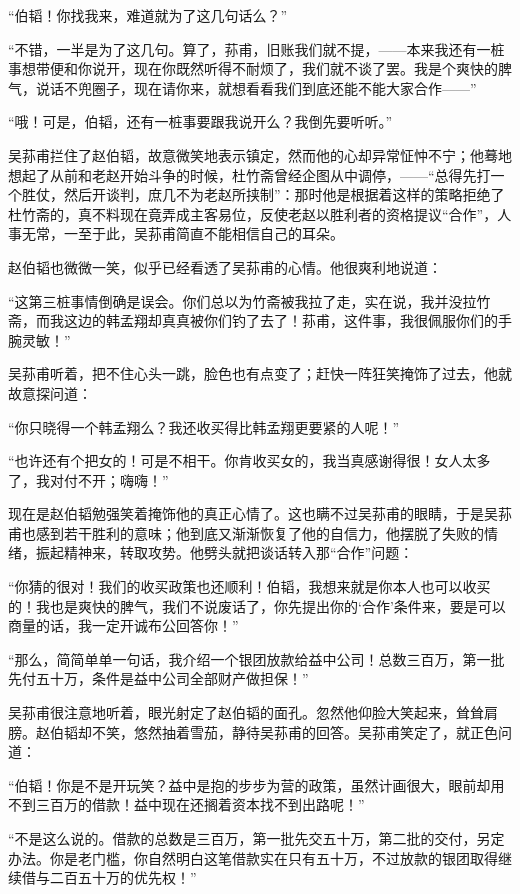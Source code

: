\par “伯韬！你找我来，难道就为了这几句话么？”
\par “不错，一半是为了这几句。算了，荪甫，旧账我们就不提，——本来我还有一桩事想带便和你说开，现在你既然听得不耐烦了，我们就不谈了罢。我是个爽快的脾气，说话不兜圈子，现在请你来，就想看看我们到底还能不能大家合作——”
\par “哦！可是，伯韬，还有一桩事要跟我说开么？我倒先要听听。”
\par 吴荪甫拦住了赵伯韬，故意微笑地表示镇定，然而他的心却异常怔忡不宁；他蓦地想起了从前和老赵开始斗争的时候，杜竹斋曾经企图从中调停，——“总得先打一个胜仗，然后开谈判，庶几不为老赵所挟制”：那时他是根据着这样的策略拒绝了杜竹斋的，真不料现在竟弄成主客易位，反使老赵以胜利者的资格提议“合作”，人事无常，一至于此，吴荪甫简直不能相信自己的耳朵。
\par 赵伯韬也微微一笑，似乎已经看透了吴荪甫的心情。他很爽利地说道：
\par “这第三桩事情倒确是误会。你们总以为竹斋被我拉了走，实在说，我并没拉竹斋，而我这边的韩孟翔却真真被你们钓了去了！荪甫，这件事，我很佩服你们的手腕灵敏！”
\par 吴荪甫听着，把不住心头一跳，脸色也有点变了；赶快一阵狂笑掩饰了过去，他就故意探问道：
\par “你只晓得一个韩孟翔么？我还收买得比韩孟翔更要紧的人呢！”
\par “也许还有个把女的！可是不相干。你肯收买女的，我当真感谢得很！女人太多了，我对付不开；嗨嗨！”
\par 现在是赵伯韬勉强笑着掩饰他的真正心情了。这也瞒不过吴荪甫的眼睛，于是吴荪甫也感到若干胜利的意味；他到底又渐渐恢复了他的自信力，他摆脱了失败的情绪，振起精神来，转取攻势。他劈头就把谈话转入那“合作”问题：
\par “你猜的很对！我们的收买政策也还顺利！伯韬，我想来就是你本人也可以收买的！我也是爽快的脾气，我们不说废话了，你先提出你的‘合作’条件来，要是可以商量的话，我一定开诚布公回答你！”
\par “那么，简简单单一句话，我介绍一个银团放款给益中公司！总数三百万，第一批先付五十万，条件是益中公司全部财产做担保！”
\par 吴荪甫很注意地听着，眼光射定了赵伯韬的面孔。忽然他仰脸大笑起来，耸耸肩膀。赵伯韬却不笑，悠然抽着雪茄，静待吴荪甫的回答。吴荪甫笑定了，就正色问道：
\par “伯韬！你是不是开玩笑？益中是抱的步步为营的政策，虽然计画很大，眼前却用不到三百万的借款！益中现在还搁着资本找不到出路呢！”
\par “不是这么说的。借款的总数是三百万，第一批先交五十万，第二批的交付，另定办法。你是老门槛，你自然明白这笔借款实在只有五十万，不过放款的银团取得继续借与二百五十万的优先权！”
